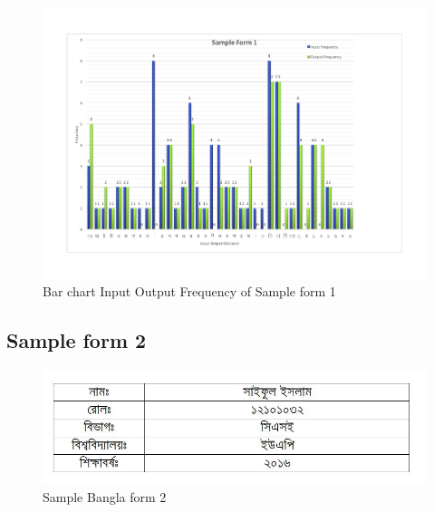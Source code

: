 \begin{figure}[H]
\centering
\includegraphics[width=1\textwidth]{Bform1.pdf}
\caption {Bar chart Input Output Frequency of Sample form 1}
\label {fig:Bbar1}
\end{figure}




\subsection{Sample form 2}
\begin{figure}[H]
\centering
\includegraphics[width=1\textwidth]{formBen02.JPG}
\caption {Sample Bangla form 2}
\label {fig:FormBan2}
\end{figure}

